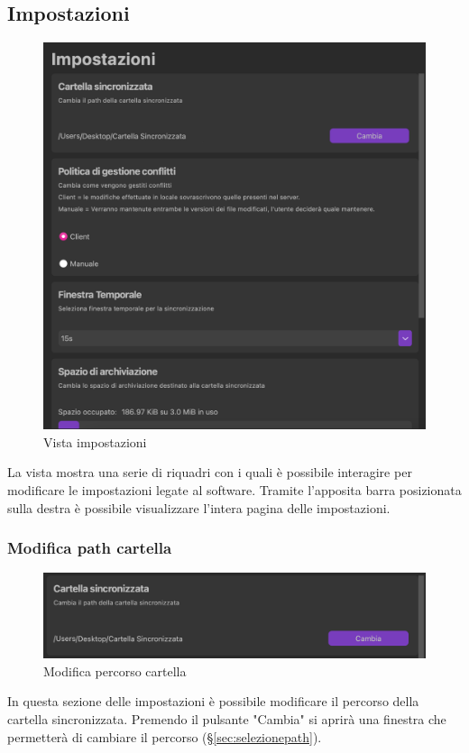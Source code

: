 \subsection{Impostazioni}
\label{sec:impostazioni}
\begin{figure}[H]
    \centering
    \includegraphics[scale = 0.7]{components/img/vistaImp.png}
    \caption{Vista impostazioni}
    \label{fig:impostazioni}
\end{figure}
La vista mostra una serie di riquadri con i quali è possibile interagire per modificare le impostazioni legate al software. Tramite l'apposita barra posizionata sulla destra è possibile visualizzare l'intera pagina delle impostazioni.

\subsubsection{Modifica path cartella}
\label{sec:cartella}
\begin{figure}[H]
    \centering
    \includegraphics[scale = 1]{components/img/ImpCartella.png}
    \caption{Modifica percorso cartella}
    \label{fig:cartella}
\end{figure}
In questa sezione delle impostazioni è possibile modificare il percorso della cartella sincronizzata. Premendo il pulsante "Cambia" si aprirà una finestra che permetterà di cambiare il percorso (\S{}\ref{sec:selezionepath}).

